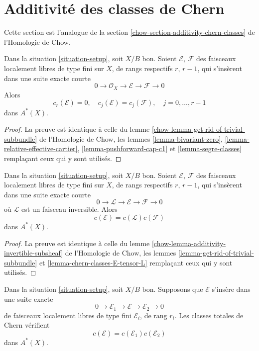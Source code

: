 \section{Additivité des classes de Chern}
\label{section-additivity-chern-classes}

\noindent
Cette section est l'analogue de la section
\ref{chow-section-additivity-chern-classes} de l'Homologie de Chow.

\begin{lemma}
\label{lemma-get-rid-of-trivial-subbundle}
Dans la situation \ref{situation-setup}, soit $X/B$ bon. Soient
$\mathcal{E}$, $\mathcal{F}$ des faisceaux localement libres de type fini sur
$X$, de rangs respectifs $r$, $r - 1$, qui s'insèrent dans une suite exacte
courte
$$
0 \to \mathcal{O}_X \to \mathcal{E} \to \mathcal{F} \to 0
$$
Alors
$$
c_r(\mathcal{E}) = 0, \quad
c_j(\mathcal{E}) = c_j(\mathcal{F}), \quad j = 0, \ldots, r - 1
$$
dans $A^*(X)$.
\end{lemma}

\begin{proof}
La preuve est identique à celle du lemme
\ref{chow-lemma-get-rid-of-trivial-subbundle} de l'Homologie de Chow, les
lemmes \ref{lemma-bivariant-zero},
\ref{lemma-relative-effective-cartier}, \ref{lemma-pushforward-cap-c1} et
\ref{lemma-segre-classes} remplaçant ceux qui y sont utilisés.
\end{proof}

\begin{lemma}
\label{lemma-additivity-invertible-subsheaf}
Dans la situation \ref{situation-setup}, soit $X/B$ bon. Soient
$\mathcal{E}$, $\mathcal{F}$ des faisceaux localement libres de type fini sur
$X$, de rangs respectifs $r$, $r - 1$, qui s'insèrent dans une suite exacte
courte
$$
0 \to \mathcal{L} \to \mathcal{E} \to \mathcal{F} \to 0
$$
où $\mathcal{L}$ est un faisceau inversible. Alors
$$
c(\mathcal{E}) = c(\mathcal{L}) c(\mathcal{F})
$$
dans $A^*(X)$.
\end{lemma}

\begin{proof}
La preuve est identique à celle du lemme
\ref{chow-lemma-additivity-invertible-subsheaf} de l'Homologie de Chow, les
lemmes \ref{lemma-get-rid-of-trivial-subbundle} et
\ref{lemma-chern-classes-E-tensor-L} remplaçant ceux qui y sont utilisés.
\end{proof}

\begin{lemma}
\label{lemma-additivity-chern-classes}
Dans la situation \ref{situation-setup}, soit $X/B$ bon. Supposons que
$\mathcal{E}$ s'insère dans une suite exacte
$$
0
\to
\mathcal{E}_1
\to
\mathcal{E}
\to
\mathcal{E}_2
\to
0
$$
de faisceaux localement libres de type fini $\mathcal{E}_i$, de rang $r_i$.
Les classes totales de Chern vérifient
$$
c(\mathcal{E}) = c(\mathcal{E}_1) c(\mathcal{E}_2)
$$
dans $A^*(X)$.
\end{lemma}

